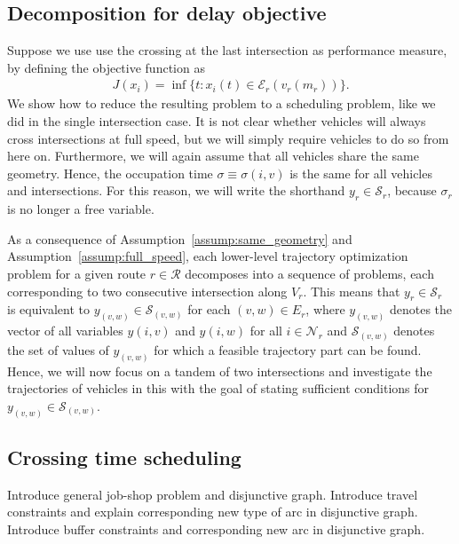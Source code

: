 \documentclass[a4paper]{article}
\theoremstyle{definition}
\theoremstyle{plain}
\begin{document}
\subsection{Decomposition for delay objective}

Suppose we use use the crossing at the last intersection as performance measure, by defining the
objective function as
\begin{align*}
  J(x_{i}) = \inf \{ t: x_{i}(t) \in \mathcal{E}_{r}(v_{r}(m_{r}))\} .
\end{align*}
%
We show how to reduce the resulting problem to a scheduling problem, like we did
in the single intersection case.
%
It is not clear whether vehicles will always cross intersections at full speed,
but we will simply require vehicles to do so from here on.
Furthermore, we will again assume that all vehicles share the same geometry.
Hence, the
occupation time $\sigma \equiv \sigma(i,v)$ is the same for all vehicles and
intersections. For this reason, we will write the shorthand $y_{r} \in \mathcal{S}_{r}$,
because $\sigma_{r}$ is no longer a free variable.

%
As a consequence of Assumption~\ref{assump:same_geometry} and Assumption~\ref{assump:full_speed},
each lower-level trajectory optimization problem for a given route
$r \in \mathcal{R}$ decomposes into a sequence of problems, each corresponding to
two consecutive intersection along $V_{r}$.
%
This means that $y_{r} \in \mathcal{S}_{r}$ is equivalent to
$y_{(v,w)} \in \mathcal{S}_{(v,w)}$ for each $(v,w) \in E_{r}$, where
$y_{(v,w)}$ denotes the vector of all variables $y(i, v)$ and $y(i, w)$ for all
$i \in \mathcal{N}_{r}$ and $\mathcal{S}_{(v,w)}$ denotes the set of values of $y_{(v,w)}$ for which a feasible trajectory part can be found.
%
Hence, we will now focus on a tandem of two intersections and investigate the
trajectories of vehicles in this with the goal of stating sufficient conditions
for $y_{(v,w)} \in \mathcal{S}_{(v,w)}$.

\subsection{Crossing time scheduling}

Introduce general job-shop problem and disjunctive graph.
Introduce travel constraints and explain corresponding new type of arc in disjunctive graph.
Introduce buffer constraints and corresponding new arc in disjunctive graph.
\end{document}
